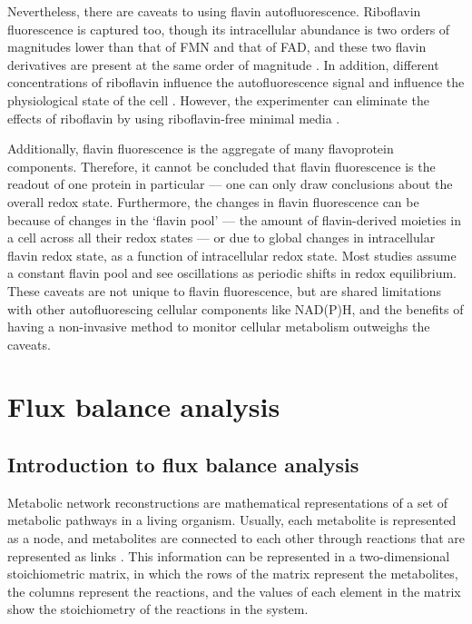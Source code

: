 Nevertheless, there are caveats to using flavin autofluorescence.
Riboflavin fluorescence is captured too, though its intracellular abundance is two orders of magnitudes lower than that of FMN and that of FAD, and these two flavin derivatives are present at the same order of magnitude \parencite{tuCyclicChangesMetabolic2007}.
In addition, different concentrations of riboflavin influence the autofluorescence signal and influence the physiological state of the cell \parencite{maslankaAutofluorescenceYeastSaccharomyces2018}.
However, the experimenter can eliminate the effects of riboflavin by using riboflavin-free minimal media \parencite{verduynEffectBenzoicAcid1992}.

Additionally, flavin fluorescence is the aggregate of many flavoprotein components.
Therefore, it cannot be concluded that flavin fluorescence is the readout of one protein in particular --- one can only draw conclusions about the overall redox state.
Furthermore, the changes in flavin fluorescence can be because of changes in the `flavin pool' --- the amount of flavin-derived moieties in a cell across all their redox states --- or due to global changes in intracellular flavin redox state, as a function of intracellular redox state.
Most studies assume a constant flavin pool and see oscillations as periodic shifts in redox equilibrium.
These caveats are not unique to flavin fluorescence, but are shared limitations with other autofluorescing cellular components like NAD(P)H, and the benefits of having a non-invasive method to monitor cellular metabolism outweighs the caveats.


\section{Flux balance analysis}
\label{sec:intro-fba}

\subsection{Introduction to flux balance analysis}
\label{subsec:intro-fba-intro}

Metabolic network reconstructions are mathematical representations of a set of metabolic pathways in a living organism.
Usually, each metabolite is represented as a node, and metabolites are connected to each other through reactions that are represented as links \parencite{palssonSystemsBiologyConstraintbased2015}.
This information can be represented in a two-dimensional stoichiometric matrix, in which the rows of the matrix represent the metabolites, the columns represent the reactions, and the values of each element in the matrix show the stoichiometry of the reactions in the system.

